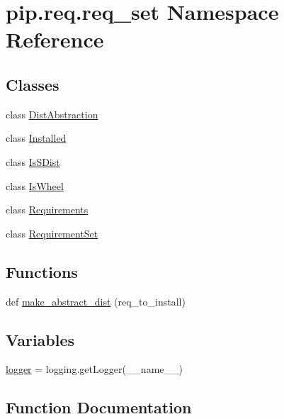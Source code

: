 \hypertarget{namespacepip_1_1req_1_1req__set}{}\section{pip.\+req.\+req\+\_\+set Namespace Reference}
\label{namespacepip_1_1req_1_1req__set}
\subsection*{Classes}
\begin{DoxyCompactItemize}
\item 
class \hyperlink{classpip_1_1req_1_1req__set_1_1_dist_abstraction}{Dist\+Abstraction}
\item 
class \hyperlink{classpip_1_1req_1_1req__set_1_1_installed}{Installed}
\item 
class \hyperlink{classpip_1_1req_1_1req__set_1_1_is_s_dist}{Is\+S\+Dist}
\item 
class \hyperlink{classpip_1_1req_1_1req__set_1_1_is_wheel}{Is\+Wheel}
\item 
class \hyperlink{classpip_1_1req_1_1req__set_1_1_requirements}{Requirements}
\item 
class \hyperlink{classpip_1_1req_1_1req__set_1_1_requirement_set}{Requirement\+Set}
\end{DoxyCompactItemize}
\subsection*{Functions}
\begin{DoxyCompactItemize}
\item 
def \hyperlink{namespacepip_1_1req_1_1req__set_a0310dc8ab7613e26b5f9d368e5a7290b}{make\+\_\+abstract\+\_\+dist} (req\+\_\+to\+\_\+install)
\end{DoxyCompactItemize}
\subsection*{Variables}
\begin{DoxyCompactItemize}
\item 
\hyperlink{namespacepip_1_1req_1_1req__set_af90cb2c437dda0849fed3f9f246b6e2c}{logger} = logging.\+get\+Logger(\+\_\+\+\_\+name\+\_\+\+\_\+)
\end{DoxyCompactItemize}


\subsection{Function Documentation}
\mbox{\label{namespacepip_1_1req_1_1req__set_a0310dc8ab7613e26b5f9d368e5a7290b}} 

